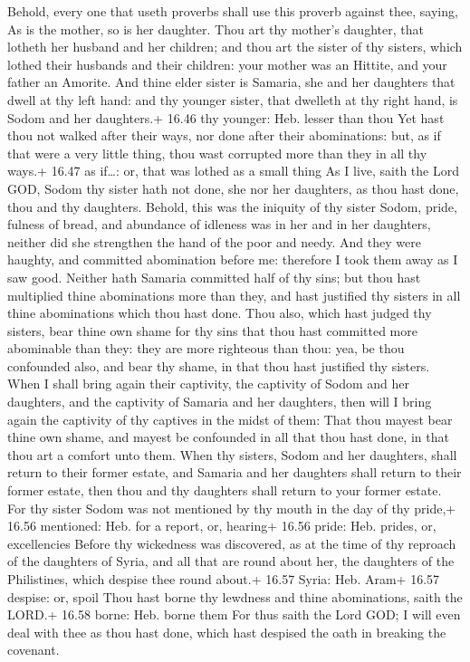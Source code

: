  Behold, every one that useth proverbs shall use this
proverb against thee, saying, As is the mother, so is her daughter.
 Thou art thy mother's daughter, that lotheth her husband
and her children; and thou art the sister of thy sisters, which lothed
their husbands and their children: your mother was an Hittite, and your
father an Amorite.  And thine elder sister is Samaria, she
and her daughters that dwell at thy left hand: and thy younger sister,
that dwelleth at thy right hand, is Sodom and her daughters.+ 16.46 thy
younger: Heb. lesser than thou  Yet hast thou not walked
after their ways, nor done after their abominations: but, as if that
were a very little thing, thou wast corrupted more than they in all thy
ways.+ 16.47 as if\ldots: or, that was lothed as a small thing
 As I live, saith the Lord GOD, Sodom thy sister hath not
done, she nor her daughters, as thou hast done, thou and thy daughters.
 Behold, this was the iniquity of thy sister Sodom, pride,
fulness of bread, and abundance of idleness was in her and in her
daughters, neither did she strengthen the hand of the poor and needy.
 And they were haughty, and committed abomination before
me: therefore I took them away as I saw good.  Neither hath
Samaria committed half of thy sins; but thou hast multiplied thine
abominations more than they, and hast justified thy sisters in all thine
abominations which thou hast done.  Thou also, which hast
judged thy sisters, bear thine own shame for thy sins that thou hast
committed more abominable than they: they are more righteous than thou:
yea, be thou confounded also, and bear thy shame, in that thou hast
justified thy sisters.  When I shall bring again their
captivity, the captivity of Sodom and her daughters, and the captivity
of Samaria and her daughters, then will I bring again the captivity of
thy captives in the midst of them:  That thou mayest bear
thine own shame, and mayest be confounded in all that thou hast done, in
that thou art a comfort unto them.  When thy sisters, Sodom
and her daughters, shall return to their former estate, and Samaria and
her daughters shall return to their former estate, then thou and thy
daughters shall return to your former estate.  For thy
sister Sodom was not mentioned by thy mouth in the day of thy pride,+
16.56 mentioned: Heb. for a report, or, hearing+ 16.56 pride: Heb.
prides, or, excellencies  Before thy wickedness was
discovered, as at the time of thy reproach of the daughters of Syria,
and all that are round about her, the daughters of the Philistines,
which despise thee round about.+ 16.57 Syria: Heb. Aram+ 16.57 despise:
or, spoil  Thou hast borne thy lewdness and thine
abominations, saith the LORD.+ 16.58 borne: Heb. borne them
 For thus saith the Lord GOD; I will even deal with thee as
thou hast done, which hast despised the oath in breaking the covenant.

